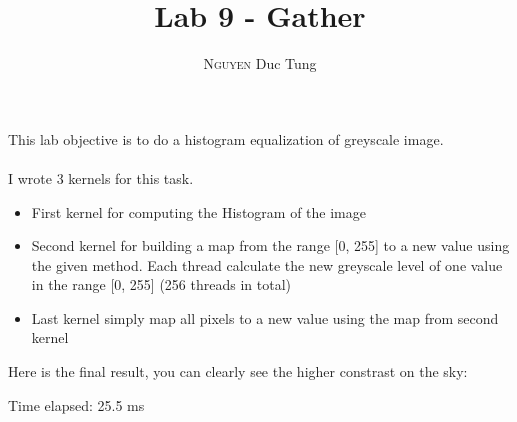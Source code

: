 \documentclass[12pt]{article}
\title{Lab 9 - Gather}
\author{\textsc{Nguyen} Duc Tung}
\date{}
\begin{document}
\maketitle

This lab objective is to do a histogram equalization of greyscale image.
\\\\
I wrote 3 kernels for this task.

\begin{itemize}
  \item First kernel for computing the Histogram of the image
  \item Second kernel for building a map from the range [0, 255] to a new value using the given method. Each thread calculate the new greyscale level of one value in the range [0, 255] (256 threads in total)
  \item Last kernel simply map all pixels to a new value using the map from second kernel
\end{itemize}

Here is the final result, you can clearly see the higher constrast on the sky:

Time elapsed: 25.5 ms
\end{document}
